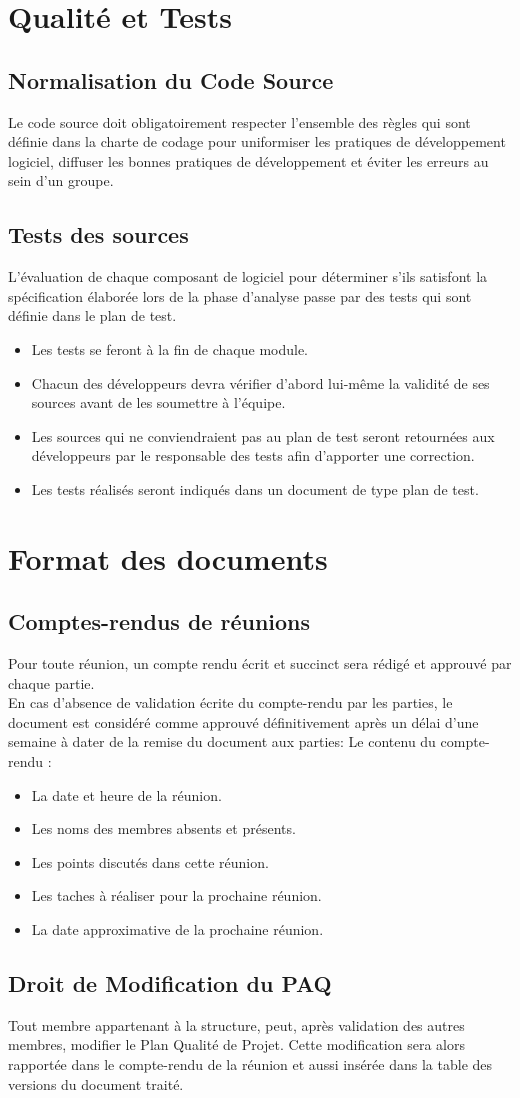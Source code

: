 \documentclass[11pt,fleqn]{book} %
\begin{document}
\chapter{ Qualité et Tests}
\section{Normalisation du Code Source}
Le code source doit obligatoirement respecter l'ensemble des règles qui sont définie dans la charte de codage pour uniformiser les pratiques de développement logiciel, diffuser les bonnes pratiques de développement et éviter les erreurs au sein d’un groupe.
\section{Tests des sources}
L’évaluation de chaque composant de logiciel pour déterminer s'ils satisfont la spécification élaborée lors de la phase d'analyse passe par des tests qui sont définie dans le plan de test.
\begin{itemize}
    \item Les tests se feront à la fin de chaque module. 
    \item Chacun des développeurs devra vérifier d’abord lui-même la validité de ses sources avant de les 
    soumettre à l’équipe.
    \item Les sources qui ne conviendraient pas au plan de test seront retournées aux développeurs par le  responsable des tests afin d’apporter une correction.
    \item Les tests réalisés seront indiqués dans un document de type plan de test.
\end{itemize}

\chapter{Format des documents}
\section{Comptes-rendus de réunions}
Pour toute réunion, un compte rendu écrit et succinct sera rédigé et approuvé par chaque partie. \\
En cas d’absence de validation écrite du compte-rendu par les parties, le document est considéré comme approuvé définitivement après un délai d’une semaine à dater de la remise du document aux parties:
Le contenu du compte-rendu :
\begin{itemize}
    \item  La date et heure de la réunion.
    \item  Les noms des membres absents et présents.
    \item  Les points discutés dans cette réunion.
    \item  Les taches à réaliser pour la prochaine réunion.
    \item  La date approximative de la prochaine réunion.
\end{itemize}
\section{ Droit de Modification du PAQ}
Tout membre appartenant à la structure, peut, après validation des autres membres, modifier le Plan Qualité de Projet. Cette modification sera alors rapportée dans le 
compte-rendu de la réunion et aussi insérée dans la table des versions du document traité. 
\end{document}
